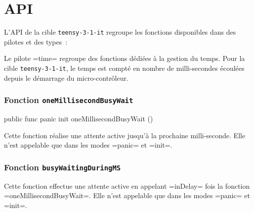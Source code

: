 \section{API}

L'API de la cible \texttt{teensy-3-1-it} regroupe les fonctions disponibles dans des pilotes et des types~:


Le pilote \plm=time= regroupe des fonctions dédiées à la gestion du temps. Pour la cible \texttt{teensy-3-1-it}, le temps est compté en nombre de milli-secondes écoulées depuis le démarrage du micro-contrôleur. 

\subsubsection{Fonction \texttt{oneMillisecondBusyWait}}


\begin{PLM}
  public func panic init oneMillisecondBusyWait ()
\end{PLM}

Cette fonction réalise une attente active jusqu'à la prochaine milli-seconde. Elle n'est appelable que dans les modes \plm=panic= et \plm=init=. 





\subsubsection{Fonction \texttt{busyWaitingDuringMS}}


Cette fonction effectue une attente active en appelant \plm=inDelay= fois la fonction \plm=oneMillisecondBusyWait=. Elle n'est appelable que dans les modes \plm=panic= et \plm=init=. 





